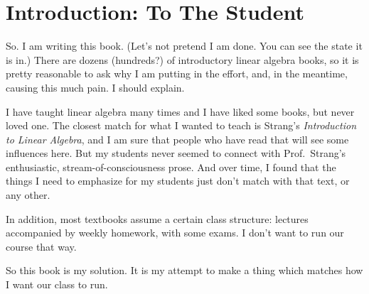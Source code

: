 \documentclass[elementsmain.tex]{subfiles}
\begin{document}
\section*{Introduction: To The Student}

So. 
I am writing this book. 
(Let's not pretend I am done. 
You can see the state it is in.) 
There are dozens (hundreds?) of introductory linear algebra books, so it is pretty reasonable to ask why I am putting in the effort, and, in the meantime, causing this much pain. 
I should explain.

I have taught linear algebra many times and I have liked some books, but never loved one. 
The closest match for what I wanted to teach is Strang's \emph{Introduction to Linear Algebra}, and I am sure that people who have read that will see some influences here. 
But my students never seemed to connect with Prof.~Strang's enthusiastic, stream-of-consciousness prose. 
And over time, I found that the things I need to emphasize for my students just don't match with that text, or any other.

In addition, most textbooks assume a certain class structure: lectures accompanied by weekly homework, with some exams. 
I don't want to run our course that way. 

So this book is my solution. 
It is my attempt to make a thing which matches how I want our class to run. 

\end{document}
